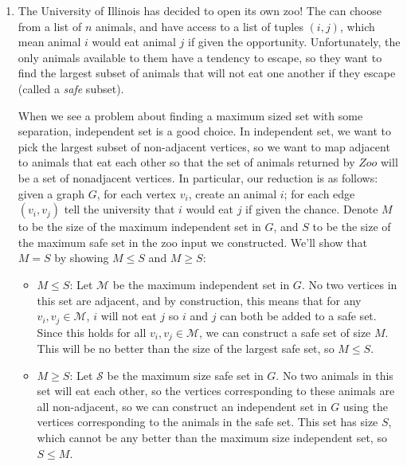 \documentclass[fleqn]{article}
\begin{document}
\begin{enumerate}
\begin{answer}
    \end{answer}
    \item The University of Illinois has decided to open its own zoo! The can choose from a list of $n$ animals, and have access to a list of tuples $(i,j)$, which mean animal $i$ would eat animal $j$ if given the opportunity. Unfortunately, the only animals available to them have a tendency to escape, so they want to find the largest subset of animals that will not eat one another if they escape (called a \textit{safe} subset).
    \begin{answer}
        When we see a problem about finding a maximum sized set with some separation, independent set is a good choice. In independent set, we want to pick the largest subset of non-adjacent vertices, so we want to map adjacent to animals that eat each other so that the set of animals returned by $Zoo$ will be a set of nonadjacent vertices. In particular, our reduction is as follows: given a graph $G$, for each vertex $v_i$, create an animal $i$; for each edge $(v_i, v_j)$ tell the university that $i$ would eat $j$ if given the chance. Denote $M$ to be the size of the maximum independent set in $G$, and $S$ to be the size of the maximum safe set in the zoo input we constructed. We'll show that $M = S$ by showing $M \leq S$ and $M \geq S$:
        \begin{itemize}
            \item $M \leq S$: Let $\mathcal{M}$ be the maximum independent set in $G$. No two vertices in this set are adjacent, and by construction, this means that for any $v_i, v_j \in \mathcal{M}$, $i$ will not eat $j$ so $i$ and $j$ can both be added to a safe set. Since this holds for all $v_i, v_j \in \mathcal{M}$, we can construct a safe set of size $M$. This will be no better than the size of the largest safe set, so $M \leq S$.
            \item $M \geq S$: Let $\mathcal{S}$ be the maximum size safe set in $G$. No two animals in this set will eat each other, so the vertices corresponding to these animals are all non-adjacent, so we can construct an independent set in $G$ using the vertices corresponding to the animals in the safe set. This set has size $S$, which cannot be any better than the maximum size independent set, so $S \leq M$.

\end{itemize}
\end{answer}
\end{enumerate}
\end{document}
